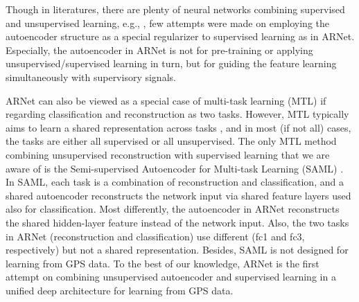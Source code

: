 \documentclass{article}
\begin{document}
Though in literatures, there are plenty of neural networks combining supervised and unsupervised learning, e.g., \cite{lee1992,karayiannis1997,raina2007self,collobert2008unified}, few attempts were made on employing the autoencoder structure as a special regularizer to supervised learning as in ARNet.
Especially, the autoencoder in ARNet is not for pre-training or applying unsupervised/supervised learning in turn, but for guiding the feature learning simultaneously with supervisory signals.

ARNet can also be viewed as a special case of multi-task learning (MTL) if regarding classification and reconstruction as two tasks.
However, MTL typically aims to learn a shared representation across tasks \cite{Caruana:1997:ML:262868.262872,Argyriou2007multi}, and in most (if not all) cases, the tasks are either all supervised or all unsupervised.
The only MTL method combining unsupervised reconstruction with supervised learning that we are aware of is the Semi-supervised Autoencoder for Multi-task Learning (SAML) \cite{zhuang2015representation}.
In SAML, %
each task is a combination of reconstruction and classification,
and a shared autoencoder reconstructs the network input via shared feature layers used also for classification.
Most differently,
the autoencoder in ARNet reconstructs the shared hidden-layer feature instead of the network input.
Also, the two tasks in ARNet (reconstruction and classification) use different (fc1 and fc3, respectively) but not a shared representation.
Besides, SAML is not designed for learning from GPS data.
To the best of our knowledge, ARNet is the first attempt on combining unsupervised autoencoder and supervised learning in a unified deep architecture for learning from GPS data.

%
\end{document}
